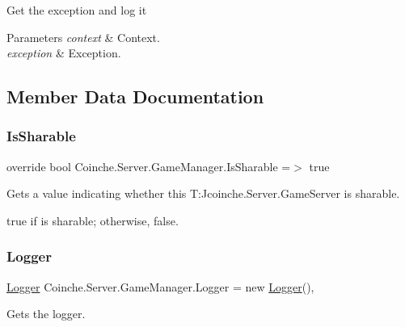 Get the exception and log it 


\begin{DoxyParams}{Parameters}
{\em context} & Context.\\
\hline
{\em exception} & Exception.\\
\hline
\end{DoxyParams}


\subsection{Member Data Documentation}
\mbox{\label{class_coinche_1_1_server_1_1_game_manager_ac42b7e22b664b020a2c0daecdbf4ace3}} 
\subsubsection{\texorpdfstring{Is\+Sharable}{IsSharable}}
{\footnotesize\ttfamily override bool Coinche.\+Server.\+Game\+Manager.\+Is\+Sharable =$>$ true}



Gets a value indicating whether this T\+:\+Jcoinche.\+Server.\+Game\+Server is sharable. 

{\ttfamily true} if is sharable; otherwise, {\ttfamily false}.\mbox{\label{class_coinche_1_1_server_1_1_game_manager_a59f6b50ef1be82252b05d12fcbf16258}} 
\subsubsection{\texorpdfstring{Logger}{Logger}}
{\footnotesize\ttfamily \hyperlink{class_coinche_1_1_tools_1_1_logger}{Logger} Coinche.\+Server.\+Game\+Manager.\+Logger = new \hyperlink{class_coinche_1_1_tools_1_1_logger}{Logger}()\hspace{0.3cm}{\ttfamily [static]}, {\ttfamily [private]}}



Gets the logger. 

